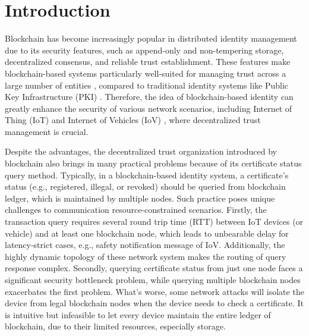 \documentclass[conference]{IEEEtran}
\begin{document}
\section{Introduction}
Blockchain has become increasingly popular in distributed identity management \cite{9075663} due to its security features, such as append-only and non-tempering storage, decentralized consensus, and reliable trust establishment. 
These features make blockchain-based systems particularly well-suited for managing trust across a large number of entities \cite{chenCertchainPublicEfficient2018a, yang2018blockchain}, compared to traditional identity systems like Public Key Infrastructure (PKI)  \cite{pki}.
Therefore, the idea of blockchain-based identity can greatly enhance the security of various network scenarios, including Internet of Thing (IoT) \cite{zhangBPAFBlockchainEnabledReliable2022a, cui2022efficient} and Internet of Vehicles (IoV)  \cite{8010820,singh2018branch}, where decentralized trust management is crucial.

Despite the advantages, the decentralized trust organization introduced by blockchain also brings in many practical problems because of its certificate status query method. Typically, in a blockchain-based identity system, a certificate's status (e.g., registered, illegal, or revoked) should be queried from blockchain ledger, which is maintained by multiple nodes. Such practice poses unique challenges to communication resource-constrained scenarios. Firstly, the transaction query requires several round trip time (RTT) between IoT devices (or vehicle) and at least one blockchain node, which leads to unbearable delay for latency-strict cases, e.g., safety notification message of IoV. Additionally, the highly dynamic topology of these network system makes the routing of query response complex. Secondly, querying certificate status from just one node faces a significant security bottleneck problem, while querying multiple blockchain nodes exacerbates the first problem. What's worse, some network attacks will isolate the device from legal blockchain nodes when the device needs to check a certificate. 
It is intuitive but infeasible to let every device maintain the entire ledger of blockchain, due to their limited resources, especially storage. 
\end{document}

